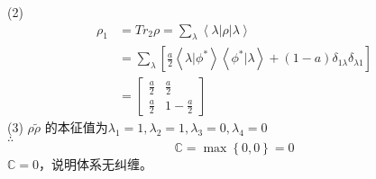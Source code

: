 \documentclass[12pt]{article}
\numberwithin{equation}{section}	 %
\begin{document}
\begin{spacing}{1.5}
\begin{equation}
\end{equation}
(2) 
\begin{align*}
\rho_{1} &= Tr_{2}\rho = \sum_{\lambda}\left<\lambda\left|\rho\right|\lambda\right> \\
&= \sum_{\lambda} \left[\frac{a}{2}\left<\lambda|\phi^{*}\right>\left<\phi^{*}|\lambda\right> + (1-a)\delta_{1\lambda}\delta_{\lambda1}\right] \\
&= \begin{bmatrix} \displaystyle \frac{a}{2} & \displaystyle \frac{a}{2} \\ \displaystyle \frac{a}{2} & \displaystyle 1-\frac{a}{2} \end{bmatrix}
\end{align*}
(3) $\rho\tilde\rho$ 的本征值为$\displaystyle \lambda_{1}=1,\lambda_{2}=1,\lambda_{3}=0,\lambda_{4}=0$ \\
$\therefore$
\begin{equation}
\mathbb{C} = \max\left\{0,0\right\} = 0
\end{equation}
$\mathbb{C} = 0$，说明体系无纠缠。

\newpage

\end{spacing}
\end{document}
